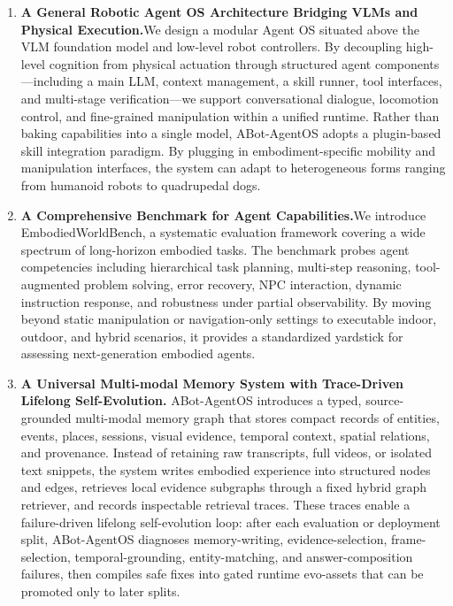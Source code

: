 \begin{enumerate}
    \item \textbf{A General Robotic Agent OS Architecture Bridging VLMs and Physical Execution.}We design a modular Agent OS situated above the VLM foundation model and low-level robot controllers. By decoupling high-level cognition from physical actuation through structured agent components---including a main LLM, context management, a skill runner, tool interfaces, and multi-stage verification---we support conversational dialogue, locomotion control, and fine-grained manipulation within a unified runtime. Rather than baking capabilities into a single model, ABot-AgentOS adopts a plugin-based skill integration paradigm. By plugging in embodiment-specific mobility and manipulation interfaces, the system can adapt to heterogeneous forms ranging from humanoid robots to quadrupedal dogs.
     \item \textbf{A Comprehensive Benchmark for Agent Capabilities.}We introduce EmbodiedWorldBench, a systematic evaluation framework covering a wide spectrum of long-horizon embodied tasks. The benchmark probes agent competencies including hierarchical task planning, multi-step reasoning, tool-augmented problem solving, error recovery, NPC interaction, dynamic instruction response, and robustness under partial observability. By moving beyond static manipulation or navigation-only settings to executable indoor, outdoor, and hybrid scenarios, it provides a standardized yardstick for assessing next-generation embodied agents.
      \item \textbf{A Universal Multi-modal Memory System with Trace-Driven Lifelong Self-Evolution.} ABot-AgentOS introduces a typed, source-grounded multi-modal memory graph that stores compact records of entities, events, places, sessions, visual evidence, temporal context, spatial relations, and provenance. Instead of retaining raw transcripts, full videos, or isolated text snippets, the system writes embodied experience into structured nodes and edges, retrieves local evidence subgraphs through a fixed hybrid graph retriever, and records inspectable retrieval traces. These traces enable a failure-driven lifelong self-evolution loop: after each evaluation or deployment split, ABot-AgentOS diagnoses memory-writing, evidence-selection, frame-selection, temporal-grounding, entity-matching, and answer-composition failures, then compiles safe fixes into gated runtime evo-assets that can be promoted only to later splits.
    

\end{enumerate}

